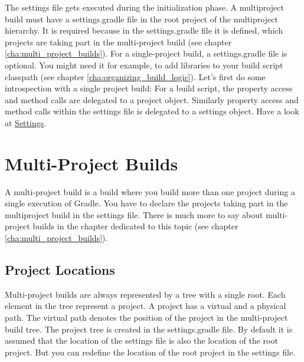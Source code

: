 The settings file gets executed during the initialization phase. A multiproject build must have a settings.gradle file in the root project of the multiproject hierarchy. It is required because in the settings.gradle file it is defined, which projects are taking part in the multi-project build (see chapter \ref{cha:multi_project_builds}). For a single-project build, a settings.gradle file is optional. You might need it for example, to add libraries to your build script classpath (see chapter \ref{cha:organizing_build_logic}). Let's first do some introspection with a single project build:
For a build script, the property access and method calls are delegated to a project object. Similarly property access and method calls within the settings file is delegated to a settings object. Have a look at \href{\API Settings.html}{\PKG Settings}.

\section{Multi-Project Builds} %
\label{sec:multi_project_builds}
A multi-project build is a build where you build more than one project during a single execution of Gradle. You have to declare the projects taking part in the multiproject build in the settings file. 
There is much more to say about multi-project builds in the chapter dedicated to this topic (see chapter \ref{cha:multi_project_builds}). 

\subsection{Project Locations} %
\label{sub:project_locations}
Multi-project builds are always represented by a tree with a single root. Each element in the tree represent a project. A project has a virtual and a physical path. The virtual path denotes the position of the project in the multi-project build tree. The project tree is created in the settings.gradle file. By default it is assumed that the location of the settings file is also the location of the root project. But you can redefine the location of the root project in the settings file.

